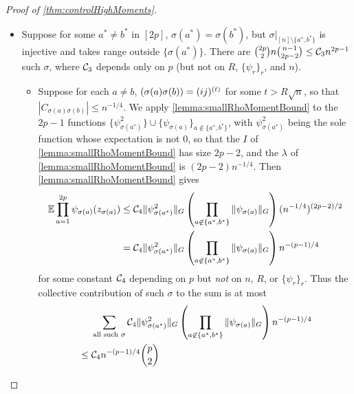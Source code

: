\documentclass[main.tex]{subfiles}
\begin{document}
\begin{proof}[Proof of \cref{thm:controlHighMoments}]
\begin{itemize}
\begin{itemize}
    \end{itemize}
    \item
        Suppose for some $a^* \ne b^*$ in $[2p]$, $\sigma(a^*) = \sigma(b^*)$, but $\sigma|_{[n] \setminus \{a^*, b^*\}}$ is injective and takes range outside $\{\sigma(a^*)\}$.
        There are $\binom {2p} 2 n \binom{n-1}{2p-2} \le \mathcal{C}_3 n^{2p-1}$ such $\sigma$, where $\mathcal{C}_3$ depends only on $p$ (but not on $R$, $\{\psi_r\}_r$, and $n$).
        \begin{itemize}
            \item 
                Suppose for each $a\ne b$, $(\sigma(a)\sigma(b)) = (ij)^{(t)}$ for some $t > R\sqrt n$, so that $|C_{\sigma(a)\sigma(b)}| \le n^{-1/4}.$
                We apply \cref{lemma:smallRhoMomentBound} to the $2p-1$ functions $\{\psi_{\sigma(a^*)}^2\} \cup \{\psi_{\sigma(a)}\}_{a \not \in \{a^*, b^*\}}$, with $\psi_{\sigma(a^*)}^2$ being the sole function whose expectation is not 0, so that the $I$ of \cref{lemma:smallRhoMomentBound} has size $2p-2$, and the $\lambda$ of \cref{lemma:smallRhoMomentBound} is $(2p-2)n^{-1/4}.$
                Then \cref{lemma:smallRhoMomentBound} gives
                \begin{align*}
                    \operatorname*{\mathbb{E}} \prod_{a=1}^{2p} \psi_{\sigma(a)}(z_{\sigma(a)})
                        &\le
                            \mathcal{C}_4
                            \|\psi^2_{\sigma(a^*)}\|_G
                            \left( \prod_{a\not\in\{a^*, b^*\}} \|\psi_{\sigma(a)}\|_G \right)
                            (n^{-1/4})^{(2p-2)/2}
                            \\
                        &=
                            \mathcal{C}_4
                            \|\psi^2_{\sigma(a^*)}\|_G
                            \left( \prod_{a\not\in\{a^*, b^*\}} \|\psi_{\sigma(a)}\|_G \right)
                            n^{-(p-1)/4}
                \end{align*}
                for some constant $\mathcal{C}_4$ depending on $p$ but \emph{not} on $n$, $R$, or $\{\psi_r\}_r$.
                Thus the collective contribution of such $\sigma$ to the sum is at most
                \begin{align*}
                    &\phantomeq
                        \sum_{\text{all such }\sigma} \CC_4
                            \|\psi^2_{\sigma(a^*)}\|_G
                            \lp \prod_{a\not\in\{a^*, b^*\}} \|\psi_{\sigma(a)}\|_G \rp
                            n^{-(p-1)/4}
                        \\
                    &\le
                        \CC_4 n^{-(p-1)/4} \binom p 2

\end{align*}
\end{itemize}
\end{itemize}
\end{proof}
\end{document}
